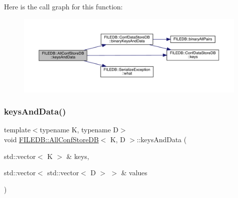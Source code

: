 Here is the call graph for this function\+:
\nopagebreak
\begin{figure}[H]
\begin{center}
\leavevmode
\includegraphics[width=350pt]{df/db6/classFILEDB_1_1AllConfStoreDB_a9150983c712d6b870a75886f92b10a9d_cgraph}
\end{center}
\end{figure}
\mbox{\label{classFILEDB_1_1AllConfStoreDB_a9150983c712d6b870a75886f92b10a9d}} 
\subsubsection{\texorpdfstring{keysAndData()}{keysAndData()}\hspace{0.1cm}{\footnotesize\ttfamily [2/3]}}
{\footnotesize\ttfamily template$<$typename K, typename D$>$ \\
void \mbox{\hyperlink{classFILEDB_1_1AllConfStoreDB}{F\+I\+L\+E\+D\+B\+::\+All\+Conf\+Store\+DB}}$<$ K, D $>$\+::keys\+And\+Data (\begin{DoxyParamCaption}\item[{std\+::vector$<$ K $>$ \&}]{keys,  }\item[{std\+::vector$<$ std\+::vector$<$ D $>$ $>$ \&}]{values }\end{DoxyParamCaption})\hspace{0.3cm}{\ttfamily [inline]}}

